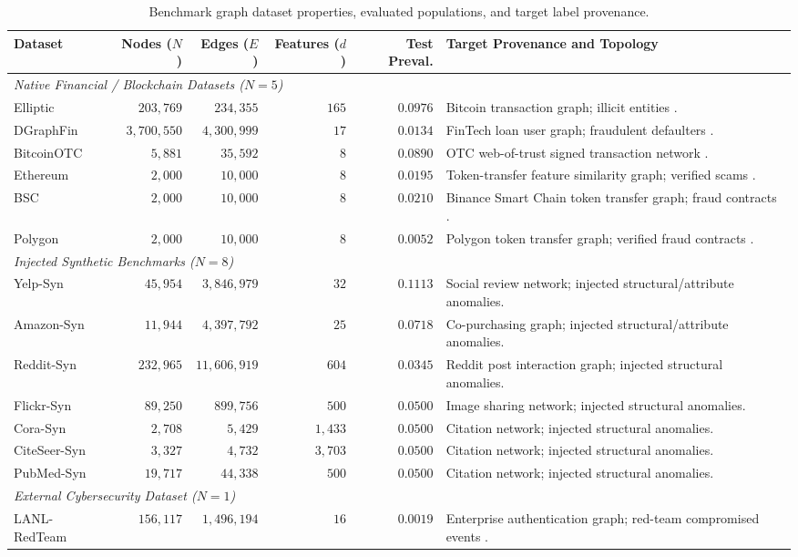 \documentclass[applsci,article,submit,moreauthors,pdftex]{Definitions/mdpi}
\begin{document}
\begin{table}[htbp]
\centering\small
\caption{Benchmark graph dataset properties, evaluated populations, and target label provenance.}
\label{tab:dataset_properties}
\begin{tabularx}{\textwidth}{lrrrrX}\toprule
\textbf{Dataset} & \textbf{Nodes ($N$)} & \textbf{Edges ($E$)} & \textbf{Features ($d$)} & \textbf{Test Preval.} & \textbf{Target Provenance and Topology} \\\midrule
\multicolumn{6}{l}{\textit{Native Financial / Blockchain Datasets ($N=5$)}} \\
Elliptic & $203,769$ & $234,355$ & $165$ & $0.0976$ & Bitcoin transaction graph; illicit entities \cite{weber2019elliptic}. \\
DGraphFin & $3,700,550$ & $4,300,999$ & $17$ & $0.0134$ & FinTech loan user graph; fraudulent defaulters \cite{huang2022dgraph}. \\
BitcoinOTC & $5,881$ & $35,592$ & $8$ & $0.0890$ & OTC web-of-trust signed transaction network \cite{kumar2016edge,snapbitcoinotc}. \\
Ethereum & $2,000$ & $10,000$ & $8$ & $0.0195$ & Token-transfer feature similarity graph; verified scams \cite{luo2024multichain}. \\
BSC & $2,000$ & $10,000$ & $8$ & $0.0210$ & Binance Smart Chain token transfer graph; fraud contracts \cite{luo2024multichain}. \\
Polygon & $2,000$ & $10,000$ & $8$ & $0.0052$ & Polygon token transfer graph; verified fraud contracts \cite{luo2024multichain}. \\\midrule
\multicolumn{6}{l}{\textit{Injected Synthetic Benchmarks ($N=8$)}} \\
Yelp-Syn & $45,954$ & $3,846,979$ & $32$ & $0.1113$ & Social review network; injected structural/attribute anomalies. \\
Amazon-Syn & $11,944$ & $4,397,792$ & $25$ & $0.0718$ & Co-purchasing graph; injected structural/attribute anomalies. \\
Reddit-Syn & $232,965$ & $11,606,919$ & $604$ & $0.0345$ & Reddit post interaction graph; injected structural anomalies. \\
Flickr-Syn & $89,250$ & $899,756$ & $500$ & $0.0500$ & Image sharing network; injected structural anomalies. \\
Cora-Syn & $2,708$ & $5,429$ & $1,433$ & $0.0500$ & Citation network; injected structural anomalies. \\
CiteSeer-Syn & $3,327$ & $4,732$ & $3,703$ & $0.0500$ & Citation network; injected structural anomalies. \\
PubMed-Syn & $19,717$ & $44,338$ & $500$ & $0.0500$ & Citation network; injected structural anomalies. \\\midrule
\multicolumn{6}{l}{\textit{External Cybersecurity Dataset ($N=1$)}} \\
LANL-RedTeam & $156,117$ & $1,496,194$ & $16$ & $0.0019$ & Enterprise authentication graph; red-team compromised events \cite{kent2015cyberdata}. \\\bottomrule
\end{tabularx}
\end{table}
\end{document}
